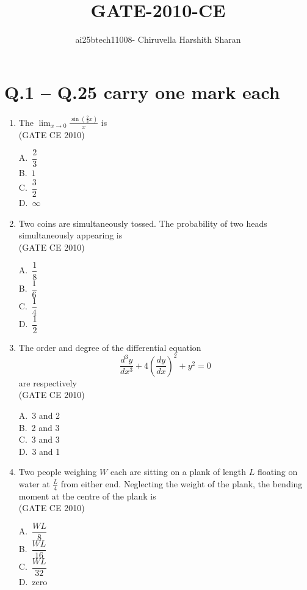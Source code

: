\documentclass[journal,12pt,onecolumn]{exam}
\title{\huge {GATE-2010-CE}}
\author{ai25btech11008- Chiruvella Harshith Sharan}
\date{}
\theoremstyle{remark}
\begin{document}
\maketitle

\setlength{\parindent}{0pt}
\setlength{\parskip}{0.5cm}

\raggedright

\section*{Q.1 -- Q.25 carry one mark each}
\begin{enumerate}
\item The $\displaystyle \lim_{x \to 0} \frac{\sin \left( \frac{2}{3} x \right)}{x}$ is \\ \hfill{(GATE CE 2010)}
\begin{multicols}{4}
A.\ $\dfrac{2}{3}$ \\
B.\ $1$ \\
C.\ $\dfrac{3}{2}$ \\
D.\ $\infty$
\end{multicols}
\noindent\item Two coins are simultaneously tossed. The probability of two heads simultaneously appearing is\\ \hfill{(GATE CE 2010)}
\begin{multicols}{4}
A.\ $\dfrac{1}{8}$ \\
B.\ $\dfrac{1}{6}$ \\
C.\ $\dfrac{1}{4}$ \\
D.\ $\dfrac{1}{2}$
\end{multicols}

\noindent\item The order and degree of the differential equation 
\[
\frac{d^3 y}{dx^3} + 4 \left( \frac{dy}{dx} \right)^2 + y^2 = 0
\]
are respectively\\ \hfill{(GATE CE 2010)}
\begin{multicols}{4}
A.\ 3 and 2 \\
B.\ 2 and 3 \\
C.\ 3 and 3 \\
D.\ 3 and 1
\end{multicols}

\noindent\item Two people weighing $W$ each are sitting on a plank of length $L$ floating on water at $\frac{L}{4}$ from either end. Neglecting the weight of the plank, the bending moment at the centre of the plank is \\\hfill{(GATE CE 2010)}
\begin{multicols}{4}
A.\ $\dfrac{WL}{8}$ \\
B.\ $\dfrac{WL}{16}$ \\
C.\ $\dfrac{WL}{32}$ \\
D.\ zero
\end{multicols}


\end{enumerate}
\end{document}
